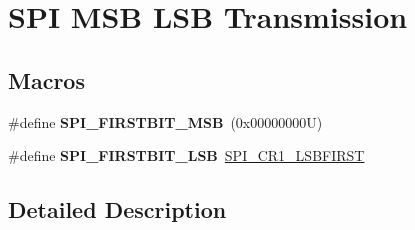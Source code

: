 \hypertarget{group___s_p_i___m_s_b___l_s_b__transmission}{}\section{S\+PI M\+SB L\+SB Transmission}
\label{group___s_p_i___m_s_b___l_s_b__transmission}
\subsection*{Macros}
\begin{DoxyCompactItemize}
\item 
\mbox{\label{group___s_p_i___m_s_b___l_s_b__transmission_ga2280ac1a6ed587b516419b5df6a8ea55}} 
\#define {\bfseries S\+P\+I\+\_\+\+F\+I\+R\+S\+T\+B\+I\+T\+\_\+\+M\+SB}~(0x00000000\+U)
\item 
\mbox{\label{group___s_p_i___m_s_b___l_s_b__transmission_ga8b608690a1adf9df40f271c228a479a3}} 
\#define {\bfseries S\+P\+I\+\_\+\+F\+I\+R\+S\+T\+B\+I\+T\+\_\+\+L\+SB}~\hyperlink{group___peripheral___registers___bits___definition_gab929e9d5ddbb66f229c501ab18d0e6e8}{S\+P\+I\+\_\+\+C\+R1\+\_\+\+L\+S\+B\+F\+I\+R\+ST}
\end{DoxyCompactItemize}


\subsection{Detailed Description}
